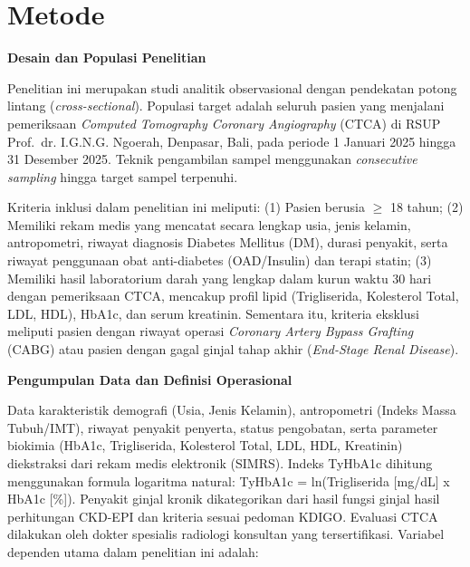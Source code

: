 \documentclass[
  indonesian,
]{agujournal2019}
\begin{document}
\section{Metode}\label{metode}

\textbf{Desain dan Populasi Penelitian}

Penelitian ini merupakan studi analitik observasional dengan pendekatan
potong lintang (\emph{cross-sectional}). Populasi target adalah seluruh
pasien yang menjalani pemeriksaan \emph{Computed Tomography Coronary
Angiography} (CTCA) di RSUP Prof.~dr. I.G.N.G. Ngoerah, Denpasar, Bali,
pada periode 1 Januari 2025 hingga 31 Desember 2025. Teknik pengambilan
sampel menggunakan \emph{consecutive sampling} hingga target sampel
terpenuhi.

Kriteria inklusi dalam penelitian ini meliputi: (1) Pasien berusia
\(\ge\) 18 tahun; (2) Memiliki rekam medis yang mencatat secara lengkap
usia, jenis kelamin, antropometri, riwayat diagnosis Diabetes Mellitus
(DM), durasi penyakit, serta riwayat penggunaan obat anti-diabetes
(OAD/Insulin) dan terapi statin; (3) Memiliki hasil laboratorium darah
yang lengkap dalam kurun waktu 30 hari dengan pemeriksaan CTCA, mencakup
profil lipid (Trigliserida, Kolesterol Total, LDL, HDL), HbA1c, dan
serum kreatinin. Sementara itu, kriteria eksklusi meliputi pasien dengan
riwayat operasi \emph{Coronary Artery Bypass Grafting} (CABG) atau
pasien dengan gagal ginjal tahap akhir (\emph{End-Stage Renal Disease}).

\textbf{Pengumpulan Data dan Definisi Operasional}

Data karakteristik demografi (Usia, Jenis Kelamin), antropometri (Indeks
Massa Tubuh/IMT), riwayat penyakit penyerta, status pengobatan, serta
parameter biokimia (HbA1c, Trigliserida, Kolesterol Total, LDL, HDL,
Kreatinin) diekstraksi dari rekam medis elektronik (SIMRS). Indeks
TyHbA1c dihitung menggunakan formula logaritma natural: TyHbA1c =
ln(Trigliserida {[}mg/dL{]} x HbA1c {[}\%{]}). Penyakit ginjal kronik
dikategorikan dari hasil fungsi ginjal hasil perhitungan CKD-EPI dan
kriteria sesuai pedoman KDIGO. Evaluasi CTCA dilakukan oleh dokter
spesialis radiologi konsultan yang tersertifikasi. Variabel dependen
utama dalam penelitian ini adalah:
\end{document}
